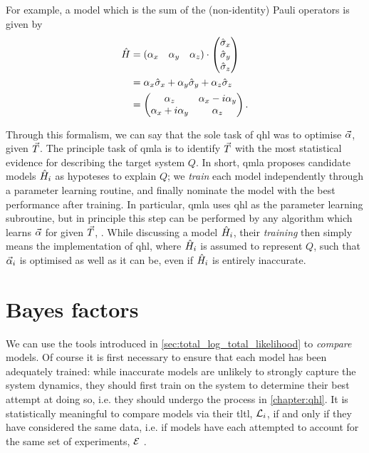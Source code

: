 For example, a model which is the sum of the (non-identity) Pauli operators is given by
\begin{align}
    \label{eqn:pauli_sum_model}
    \begin{split}
        \hat{H} &= \begin{matrix}(\alpha_x & \alpha_y & \alpha_z)\end{matrix} \cdot \left(\begin{matrix}\hat{\sigma}_{x} \\ \hat{\sigma}_{y} \\ \hat{\sigma}_{z}\end{matrix}\right) \\
        &= \alpha_x \hat{\sigma}_{x} + \alpha_y \hat{\sigma}_{y} + \alpha_z \hat{\sigma}_{z} \\
        &= \begin{pmatrix}
            \alpha_z & \alpha_x - i \alpha_y \\
            \alpha_x + i\alpha_y & \alpha_z
        \end{pmatrix}.
    \end{split}
\end{align}
\par 

Through this formalism, we can say that the sole task of \gls{qhl} was to optimise $\vec{\alpha}$, given ${ \vec{T} }$. 
The principle task of \gls{qmla} is to identify ${ \vec{T} }$ with the most statistical evidence 
    for describing the target system $Q$. 
In short, \gls{qmla} proposes candidate models $\hat{H}_i$ as hypoteses to explain $Q$; 
    we \emph{train} each model independently through a parameter learning routine, 
    and finally nominate the model with the best performance after training. 
In particular, \gls{qmla} uses \gls{qhl} as the parameter learning subroutine, 
    but in principle this step can be performed by any algorithm which learns $\vec{\alpha}$ for given ${ \vec{T} }$, 
    \cite{wang2015hamiltonian, krastanov2019stochastic, flurin2020using, niu2019learning, 
    greplova2017quantum,lokhov2018optimal, acampora2019evolutionary, burgarth2017evolution}. 
While discussing a model $\hat{H}_i$, their \emph{training} then simply means the implementation 
    of \gls{qhl}, where $\hat{H}_i$ is assumed to represent $Q$, 
    such that $\vec{\alpha}_i$ is optimised as well as it can be, even if $\hat{H}_i$ is entirely inaccurate. 

\section{Bayes factors}\label{sec:bayes_factors}
We can use the tools introduced in \cref{sec:total_log_total_likelihood} to \emph{compare} models. 
Of course it is first necessary to ensure that each model has  
    been adequately trained: while inaccurate models are unlikely to strongly 
    capture the system dynamics, they should first train on the system 
    to determine their best attempt at doing so, 
    i.e. they should undergo the process in \cref{chapter:qhl}.
It is statistically meaningful to compare models via their \gls{tltl}, ${\mathcal{L}}_i$, 
    if and only if they have considered the same data, 
    i.e. if models have each attempted to account for the same set of experiments, ${ \mathcal{E} }$ \cite{kass1995bayes}.
\par 

